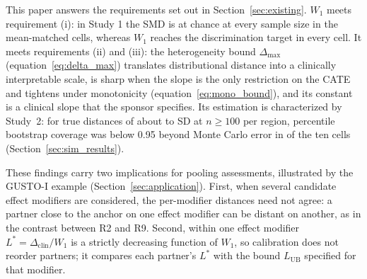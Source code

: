 \documentclass[AMA,Times1COL]{WileyNJDv5}
\begin{document}
This paper answers the requirements set out in Section~\ref{sec:existing}. $W_1$ meets requirement (i): in Study 1 the SMD is at chance at every sample size in the mean-matched cells, whereas $W_1$ reaches the discrimination target in every cell. It meets requirements (ii) and (iii): the heterogeneity bound \(\Delta_{\max}\) (equation~\ref{eq:delta_max}) translates distributional distance into a clinically interpretable scale, is sharp when the slope is the only restriction on the CATE and tightens under monotonicity (equation~\ref{eq:mono_bound}), and its constant is a clinical slope that the sponsor specifies. Its estimation is characterized by Study~2: for true distances of about  to  SD at $n \geq 100$ per region, percentile bootstrap coverage was below 0.95 beyond Monte Carlo error in  of the ten cells (Section~\ref{sec:sim_results}).

These findings carry two implications for pooling assessments, illustrated by the GUSTO-I example (Section~\ref{sec:application}). First, when several candidate effect modifiers are considered, the per-modifier distances need not agree: a partner close to the anchor on one effect modifier can be distant on another, as in the contrast between R2 and R9. Second, within one effect modifier $L^* = \Delta_{\text{clin}} / W_1$ is a strictly decreasing function of $W_1$, so calibration does not reorder partners; it compares each partner's $L^*$ with the bound $L_{\text{UB}}$ specified for that modifier.
\end{document}
